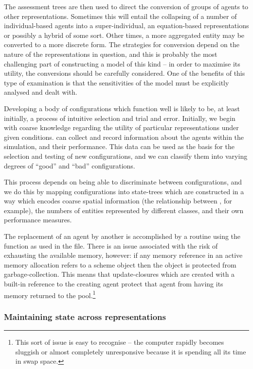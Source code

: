 The assessment trees are then used to direct the conversion of groups
of agents to other representations.  Sometimes this will entail the
collapsing of a number of individual-based agents into a
super-individual, an equation-based representations or possibly a
hybrid of some sort.  Other times, a more aggregated entity may be
converted to a more discrete form. The strategies for conversion
depend on the nature of the representations in question, and this is
probably the most challenging part of constructing a model of this
kind -- in order to maximise its utility, the conversions should be
carefully considered.  One of the benefits of this type of examination
is that the sensitivities of the model must be explicitly analysed and
dealt with.

Developing a body of configurations which function well is likely to
be, at least initially, a process of intuitive selection and trial and
error. Initially, we begin with coarse knowledge regarding the utility
of particular representations under given conditions. \mloggers can
collect and record information about the agents within the simulation,
and their performance. This data can be used as the basis for the
selection and testing of new configurations, and we can classify them
into varying degrees of ``good'' and ``bad'' configurations.

This process depends on being able to discriminate between
configurations, and we do this by mapping configurations into
state-trees which are constructed in a way which encodes coarse
spatial information (the relationship between \mpatches, for example),
the numbers of entities represented by different classes, and their
own performance measures.

The replacement of an agent by another is accomplished by a routine
using the  function as used in
the  file. There is an issue associated with
the risk of exhausting the available memory, however: if any memory
reference in an active memory allocation refers to a scheme object
then the object is protected from garbage-collection.  This means that
update-closures which are created with a built-in reference to the
creating agent protect that agent from having its memory returned to
the pool.\footnote{This sort of issue is easy to recognise -- the
computer rapidly becomes sluggish or almost completely unresponsive
because it is spending all its time in swap space.}


\subsubsection{Maintaining state across representations}

